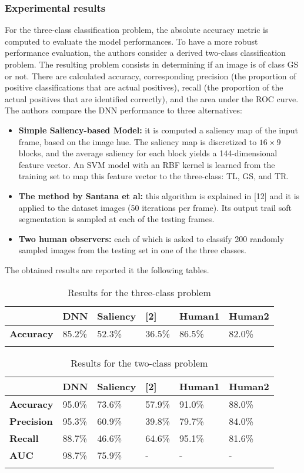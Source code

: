 \subsubsection{Experimental results}\label{header-n72}

For the three-class classification problem, the absolute accuracy metric
is computed to evaluate the model performances. To have a more robust
performance evaluation, the authors consider a derived two-class
classification problem. The resulting problem consists in determining if
an image is of class GS or not. There are calculated accuracy,
corresponding precision (the proportion of positive classifications that
are actual positives), recall (the proportion of the actual positives
that are identified correctly), and the area under the ROC curve. The
authors compare the DNN performance to three alternatives:

\begin{itemize}
\item
  \textbf{Simple Saliency-based Model:} it is computed a saliency map of
  the input frame, based on the image hue. The saliency map is
  discretized to $16 \times 9$ blocks, and the average saliency for each block
  yields a 144-dimensional feature vector. An SVM model with an RBF
  kernel is learned from the training set to map this feature vector to
  the three-class: TL, GS, and TR.
\item
  \textbf{The method by Santana et al:} this algorithm is explained in
  {[}12{]} and it is applied to the dataset images (50 iterations per
  frame). Its output trail soft segmentation is sampled at each of the
  testing frames.
\item
  \textbf{Two human observers:} each of which is asked to classify 200
  randomly sampled images from the testing set in one of the three
  classes.
\end{itemize}

The obtained results are reported it the following tables.

\begin{longtable}[]{@{}llllll@{}}

\toprule
& \textbf{DNN} & \textbf{Saliency} & \textbf{{[}2{]}} & \textbf{Human1}
& \textbf{Human2}\tabularnewline
\midrule
\endhead
\textbf{Accuracy} & 85.2\% & 52.3\% & 36.5\% & 86.5\% &
82.0\%\tabularnewline
\bottomrule
\caption{Results for the three-class problem}
\end{longtable}

\begin{longtable}[]{@{}llllll@{}}
\toprule
& \textbf{DNN} & \textbf{Saliency} & \textbf{{[}2{]}} & \textbf{Human1}
& \textbf{Human2}\tabularnewline
\midrule
\endhead
\textbf{Accuracy} & 95.0\% & 73.6\% & 57.9\% & 91.0\% &
88.0\%\tabularnewline
\textbf{Precision} & 95.3\% & 60.9\% & 39.8\% & 79.7\% &
84.0\%\tabularnewline
\textbf{Recall} & 88.7\% & 46.6\% & 64.6\% & 95.1\% &
81.6\%\tabularnewline
\textbf{AUC} & 98.7\% & 75.9\% & - & - & -\tabularnewline
\bottomrule
\caption{Results for the two-class problem}
\end{longtable}

